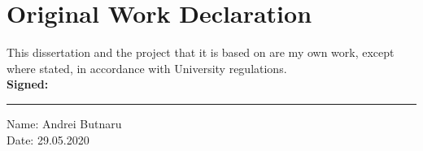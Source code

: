 \chapter*{Original Work Declaration}
This dissertation and the project that it is based on are my own work, except where stated, in accordance with University regulations.
\\ \newline \newline
\textbf{Signed:}
\hrule width 0.5\textwidth
\vspace{6pt}
\noindent
Name: Andrei Butnaru
\\
Date: 29.05.2020
\\